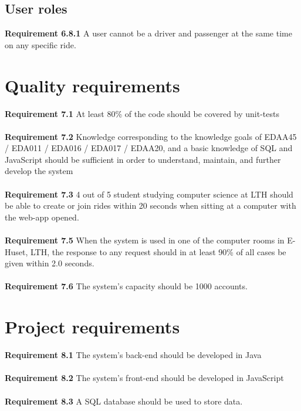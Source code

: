 \documentclass{article}
\begin{document}
\subsection{User roles}
\textbf{Requirement 6.8.1} A user cannot be a driver and passenger at the same time on any specific ride.

\section{Quality requirements}
\textbf{Requirement 7.1} At least 80\% of the code should be covered by unit-tests
\\ \\
\textbf{Requirement 7.2} Knowledge corresponding to the knowledge goals of EDAA45 / EDA011 / EDA016 / EDA017 / EDAA20, and a basic knowledge of SQL and JavaScript should be sufficient in order to understand, maintain, and further develop the system
\\ \\
\textbf{Requirement 7.3} 4 out of 5 student studying computer science at LTH should be able to create or join rides within 20 seconds when sitting at a computer with the web-app opened.
\\ \\

\textbf{Requirement 7.5} When the system is used in one of the computer rooms in E-Huset, LTH, the response to any request should in at least 90\% of all cases be given within 2.0 seconds.
\\ \\
\textbf{Requirement 7.6} The system's capacity should be 1000 accounts.

\section{Project requirements}


\textbf{Requirement 8.1} The system's back-end should be developed in Java
\\ \\
\textbf{Requirement 8.2} The system's front-end should be developed in JavaScript
\\ \\
\textbf{Requirement 8.3} A SQL database should be used to store data.
\end{document}
